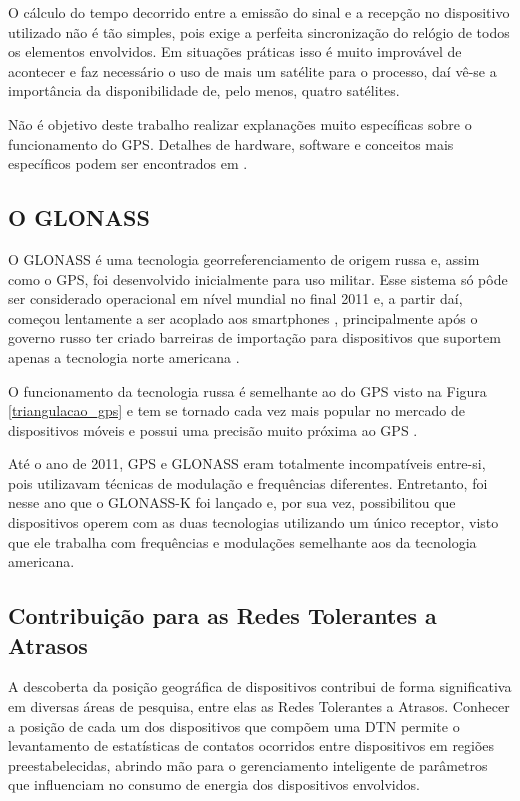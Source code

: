 O cálculo do tempo decorrido entre a emissão do sinal e a recepção no dispositivo utilizado não é tão simples, pois exige a perfeita sincronização do relógio de todos os elementos envolvidos. Em situações práticas isso é muito improvável de acontecer e faz necessário o uso de mais um satélite para o processo, daí vê-se a importância da disponibilidade de, pelo menos, quatro satélites.

Não é objetivo deste trabalho realizar explanações muito específicas sobre o funcionamento do GPS. Detalhes de hardware, software e conceitos mais específicos podem ser encontrados em \cite{longley2009sistemas}.

\subsection{O GLONASS}

O GLONASS é uma tecnologia georreferenciamento de origem russa e, assim como o GPS, foi desenvolvido inicialmente para uso militar. Esse sistema só pôde ser considerado operacional em nível mundial no final 2011 e, a partir daí, começou lentamente a ser acoplado aos smartphones \cite{vaz2013comparaccao}, principalmente após o governo russo ter criado barreiras de importação para dispositivos que suportem apenas a tecnologia norte americana \cite{impostoRussia}.

O funcionamento da tecnologia russa é semelhante ao do GPS visto na Figura \ref{triangulacao_gps} e tem se tornado cada vez mais popular no mercado de dispositivos móveis e possui uma precisão muito próxima ao GPS \cite{vaz2013comparaccao}.

Até o ano de 2011, GPS e GLONASS eram totalmente incompatíveis entre-si, pois utilizavam técnicas de modulação e frequências diferentes. Entretanto, foi nesse ano que o GLONASS-K foi lançado e, por sua vez, possibilitou que dispositivos operem com as duas tecnologias utilizando um único receptor, visto que ele trabalha com frequências e modulações semelhante aos da tecnologia americana\newline \cite{kovar2011interoperable}.

\subsection{Contribuição para as Redes Tolerantes a Atrasos}

A descoberta da posição geográfica de dispositivos contribui de forma significativa em diversas áreas de pesquisa, entre elas as Redes Tolerantes a Atrasos. Conhecer a posição de cada um dos dispositivos que compõem uma DTN permite o levantamento de estatísticas de contatos ocorridos entre dispositivos em regiões preestabelecidas, abrindo mão para o gerenciamento inteligente de parâmetros que influenciam no consumo de energia dos dispositivos envolvidos.

